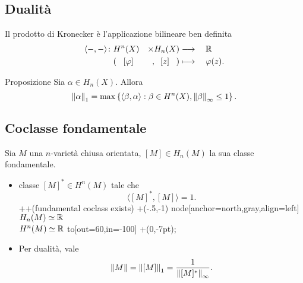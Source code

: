 \documentclass{beamer}
\begin{document}
\subsection{Dualità}
\begin{frame}{\secname}{\subsecname}
Il prodotto di Kronecker è l'applicazione bilineare {\color{gray} ben definita}
\begin{alignat*}{4}
\langle-,-\rangle\colon&H^n(X)&\times H_n(X)&\longrightarrow{}&&\mathbb{R}\\
&(\;\;\;[\varphi]&,\;\;[z]\;\;\;)&\longmapsto{}&&\varphi(z).
\end{alignat*}

\begin{block}{Proposizione}
Sia $\alpha\in H_n(X)$. Allora
\[
\left\lVert \alpha\right\rVert_1=\max\left\{\langle\beta,\alpha\rangle:\beta\in H^n(X),\left\lVert \beta\right\rVert_\infty\le 1\right\}.
\]
\end{block}
\end{frame}
\subsection{Coclasse fondamentale}
\begin{frame}{\secname}{\subsecname}
Sia $M$ una $n$-varietà chiusa orientata, $[M]\in H_n(M)$ la sua classe fondamentale.

\begin{itemize}
\item {} classe $[M]^*\in H^n(M)$ tale che
\[
\langle[M]^*,[M]\rangle=1.
\]
 ++(fundamental coclass exists) +(-.5,-1) node[anchor=north,gray,align=left] {$H_n(M)\simeq\mathbb{R}$\\$H^n(M)\simeq\mathbb{R}$} to[out=60,in=-100] +(0,-7pt);
\item Per dualità, vale
\[
\left\lVert M\right\rVert=\left\lVert [M]\right\rVert_1=\frac{1}{\left\lVert [M]^*\right\rVert_\infty}.
\]
\end{itemize}
\end{frame}
\end{document}
